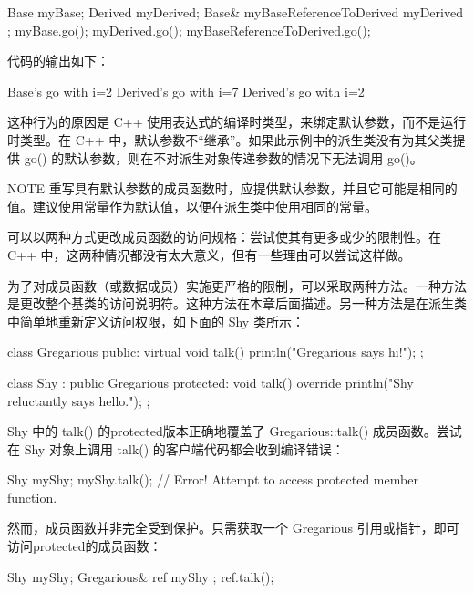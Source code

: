 \begin{cpp}
Base myBase;
Derived myDerived;
Base& myBaseReferenceToDerived { myDerived };
myBase.go();
myDerived.go();
myBaseReferenceToDerived.go();
\end{cpp}

代码的输出如下：

\begin{shell}
Base's go with i=2
Derived's go with i=7
Derived's go with i=2
\end{shell}

这种行为的原因是 C++ 使用表达式的编译时类型，来绑定默认参数，而不是运行时类型。在 C++ 中，默认参数不“继承”。如果此示例中的派生类没有为其父类提供 go() 的默认参数，则在不对派生对象传递参数的情况下无法调用 go()。

\begin{myNotic}{NOTE}
重写具有默认参数的成员函数时，应提供默认参数，并且它可能是相同的值。建议使用常量作为默认值，以便在派生类中使用相同的常量。
\end{myNotic}


可以以两种方式更改成员函数的访问规格：尝试使其有更多或少的限制性。在 C++ 中，这两种情况都没有太大意义，但有一些理由可以尝试这样做。

为了对成员函数（或数据成员）实施更严格的限制，可以采取两种方法。一种方法是更改整个基类的访问说明符。这种方法在本章后面描述。另一种方法是在派生类中简单地重新定义访问权限，如下面的 Shy 类所示：

\begin{cpp}
class Gregarious
{
    public:
        virtual void talk() { println("Gregarious says hi!"); }
};

class Shy : public Gregarious
{
    protected:
        void talk() override { println("Shy reluctantly says hello."); }
};
\end{cpp}

Shy 中的 talk() 的protected版本正确地覆盖了 Gregarious::talk() 成员函数。尝试在 Shy 对象上调用 talk() 的客户端代码都会收到编译错误：

\begin{cpp}
Shy myShy;
myShy.talk(); // Error! Attempt to access protected member function.
\end{cpp}

然而，成员函数并非完全受到保护。只需获取一个 Gregarious 引用或指针，即可访问protected的成员函数：

\begin{cpp}
Shy myShy;
Gregarious& ref { myShy };
ref.talk();
\end{cpp}

